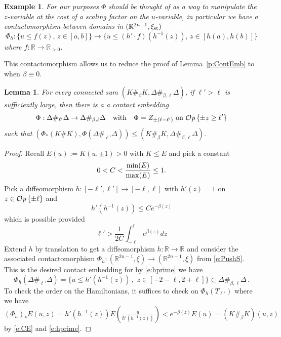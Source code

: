 \documentclass[12pt]{paper}
\theoremstyle{plain}
\newtheorem{lemma}[theorem]{Lemma}
\newtheorem{ex}[theorem]{Example}
\theoremstyle{definition}
\newcommand{\abs}[1]{\left| #1 \right|}
\newcommand{\R}{{\mathbb{R}}}
\newcommand{\st}{{\rm st}}
\renewcommand{\min}{{\rm min}}
\renewcommand{\max}{{\rm max}}
\def\Op{{\mathcal O}{\it p}\,}
\numberwithin{figure}{section}
\begin{document}
\begin{ex}\label{ex:Scaledomain}{\rm
For our purposes $\Phi$ should be thought of as a way to manipulate the $z$-variable at the cost of a scaling factor on
the $u$-variable, in particular we have a contactomorphism between domains in $(\R^{2n-1}, \xi_\st)$
$$
	\Phi_h: \{ u \leq f(z),\, z \in [a,b]\} \to \{u \leq (h' \cdot f)(h^{-1}(z)),\, z \in [h(a), h(b)]\}
$$
where $f: \R \to \R_{>0}$.}
\end{ex}

This contactomorphism allows us to reduce the proof of Lemma~\ref{p:ContEmb} to when $\beta \equiv 0$.
\begin{lemma}\label{l:ChangeNeck}
	For every connected sum $(K \#_{\beta} K, \Delta \#_{\beta, \ell} \Delta)$, if $\ell' > \ell$ is sufficiently
	large, then there is a a contact embedding
	$$
		\Phi: \Delta\#_{\ell'}\Delta \to \Delta\#_{\beta, \ell}\Delta \quad\mbox{with}\quad
		\Phi = Z_{\pm(\ell-\ell')} \mbox{ on } \Op \{\pm z \geq \ell'\}
	$$
	such that 
	$(\Phi_*(K \# K), \Phi(\Delta\#_{\ell'}\Delta)) \leq (K \#_{\beta} K, \Delta \#_{\beta, \ell} \Delta).$
\end{lemma}
\begin{proof}
	Recall $E(u) := K(u, \pm 1) > 0$ with $K \leq E$ and pick a constant
	\begin{equation}\label{e:CE}
		0 < C < \frac{\min(E)}{\max(E)} \leq 1.
	\end{equation}
	Pick a diffeomorphism $h:[-\ell', \ell'] \to [-\ell, \ell]$ with $h'(z) = 1$ on $z \in \Op\{\pm \ell\}$
	and
	\begin{equation}\label{e:hprime}
		h'(h^{-1}(z)) \leq C e^{-\beta(z)}
	\end{equation}
	which is possible provided
	$$
		\ell' > \frac{1}{2C} \int_{-\ell}^{\ell} e^{\beta(z)}dz
	$$
	Extend $h$ by translation to get a diffeomorphism $h: \R \to \R$ and consider the associated contactomorphism 
	$\Phi_h: (\R^{2n-1}, \xi) \to (\R^{2n-1}, \xi)$ from \eqref{e:PushS}.  This is the desired contact embedding
	for by \eqref{e:hprime} we have
	$$
		\Phi_h(\Delta\#_{\ell'}\Delta) = \{u \leq h'(h^{-1}(z))\,,\,\, z \in [-2-\ell, 2+\ell]\} \subset \Delta\#_{\beta,\ell}\Delta\,.
	$$
	To check the order on the Hamiltonians, it suffices to check on $\Phi_h(T_{\ell'})$ where we have
	$$
		(\Phi_h)_*E(u,z) = h'(h^{-1}(z)) E(\tfrac{u}{h'(h^{-1}(z))})
		 < e^{-\beta(z)} E(u) = (K\#_{\beta}K)(u,z)
	$$
	by \eqref{e:CE} and \eqref{e:hprime}.
\end{proof}
\end{document}
